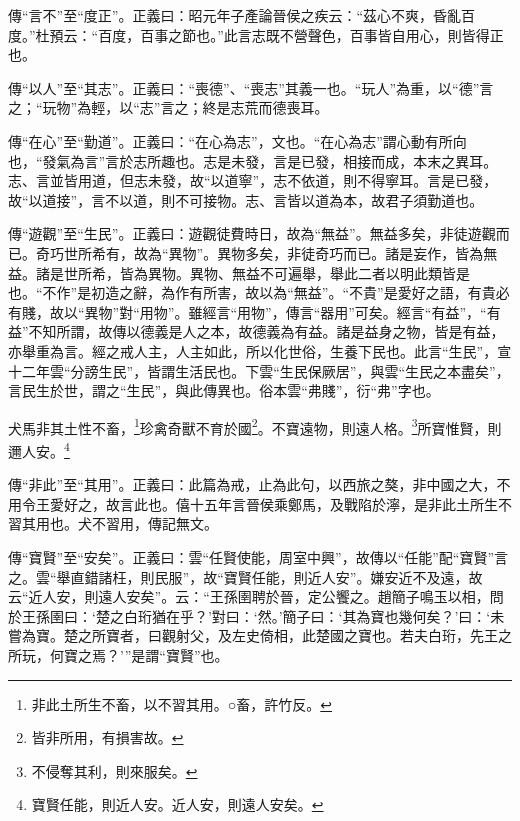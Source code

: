 {\noindent\zhuan{}\fzbyks 傳“言不”至“度正”。正義曰：昭元年子產論晉侯之疾云：“茲心不爽，昏亂百度。”杜預云：“百度，百事之節也。”此言志既不營聲色，百事皆自用心，則皆得正也。 \par}

{\noindent\zhuan{}\fzbyks 傳“以人”至“其志”。正義曰：“喪德”、“喪志”其義一也。“玩人”為重，以“德”言之；“玩物”為輕，以“志”言之；終是志荒而德喪耳。 \par}

{\noindent\zhuan{}\fzbyks 傳“在心”至“勤道”。正義曰：“在心為志”，文也。“在心為志”謂心動有所向也，“發氣為言”言於志所趣也。志是未發，言是已發，相接而成，本末之異耳。志、言並皆用道，但志未發，故“以道寧”，志不依道，則不得寧耳。言是已發，故“以道接”，言不以道，則不可接物。志、言皆以道為本，故君子須勤道也。 \par}

{\noindent\zhuan{}\fzbyks 傳“遊觀”至“生民”。正義曰：遊觀徒費時日，故為“無益”。無益多矣，非徒遊觀而已。奇巧世所希有，故為“異物”。異物多矣，非徒奇巧而已。諸是妄作，皆為無益。諸是世所希，皆為異物。異物、無益不可遍舉，舉此二者以明此類皆是也。“不作”是初造之辭，為作有所害，故以為“無益”。“不貴”是愛好之語，有貴必有賤，故以“異物”對“用物”。雖經言“用物”，傳言“器用”可矣。經言“有益”，“有益”不知所謂，故傳以德義是人之本，故德義為有益。諸是益身之物，皆是有益，亦舉重為言。經之戒人主，人主如此，所以化世俗，生養下民也。此言“生民”，宣十二年雲“分謗生民”，皆謂生活民也。下雲“生民保厥居”，與雲“生民之本盡矣”，言民生於世，謂之“生民”，與此傳異也。俗本雲“弗賤”，衍“弗”字也。 \par}

犬馬非其土性不畜，\footnote{非此土所生不畜，以不習其用。○畜，許竹反。}珍禽奇獸不育於國\footnote{皆非所用，有損害故。}。不寶遠物，則遠人格。\footnote{不侵奪其利，則來服矣。}所寶惟賢，則邇人安。\footnote{寶賢任能，則近人安。近人安，則遠人安矣。}

{\noindent\zhuan{}\fzbyks 傳“非此”至“其用”。正義曰：此篇為戒，止為此句，以西旅之獒，非中國之大，不用令王愛好之，故言此也。僖十五年言晉侯乘鄭馬，及戰陷於濘，是非此土所生不習其用也。犬不習用，傳記無文。 \par}

{\noindent\zhuan{}\fzbyks 傳“寶賢”至“安矣”。正義曰：雲“任賢使能，周室中興”，故傳以“任能”配“寶賢”言之。雲“舉直錯諸枉，則民服”，故“寶賢任能，則近人安”。嫌安近不及遠，故云“近人安，則遠人安矣”。云：“王孫圉聘於晉，定公饗之。趙簡子鳴玉以相，問於王孫圉曰：‘楚之白珩猶在乎？’對曰：‘然。’簡子曰：‘其為寶也幾何矣？’曰：‘未嘗為寶。楚之所寶者，曰觀射父，及左史倚相，此楚國之寶也。若夫白珩，先王之所玩，何寶之焉？’”是謂“寶賢”也。 \par}

